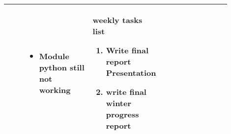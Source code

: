 \begin{longtable}{|l|p{0.3\linewidth}|p{0.3\linewidth}|p{0.3\linewidth}|}
\begin{itemize}
\end{itemize}
			&
\begin{itemize}
\item   Module python still not working  
\end{itemize}			
			
			&
			\textbf{ weekly tasks list}
	\begin{enumerate}
	\item Write final report Presentation 
	\item write final winter progress report 
	\end{enumerate}

			\\\hline
			
		\end{longtable}

